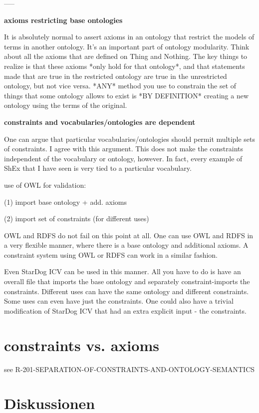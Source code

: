 \documentclass{llncs}
\begin{document}
-----

\textbf{axioms restricting base ontologies}

It is absolutely normal to assert axioms in an ontology that restrict the models of terms in another ontology. It's an important part of ontology modularity.
Think about all the axioms that are defined on Thing and Nothing.
The key things to realize is that these axioms *only hold for that ontology*, and that statements made that are true in the restricted ontology are true in the unrestricted ontology, but not vice versa.  
*ANY* method you use to constrain the set of things that some ontology allows to exist is *BY DEFINITION* creating a new ontology using the terms of the original.

\textbf{constraints and vocabularies/ontologies are dependent}

One can argue that particular vocabularies/ontologies should permit multiple sets of constraints.  I agree with this argument.  This does not make the constraints independent of the vocabulary or ontology, however.  In fact, every example of ShEx that I have seen is very tied to a particular vocabulary.

use of OWL for validation:

(1) import base ontology + add. axioms

(2) import set of constraints (for different uses)

OWL and RDFS do not fail on this point at all.  One can use OWL and RDFS in a very flexible manner, where there is a base ontology and additional axioms.  A constraint system using OWL or RDFS can work in a similar fashion.

Even StarDog ICV can be used in this manner.  All you have to do is have an overall file that imports the base ontology and separately constraint-imports the constraints.  Different uses can have the same ontology and different constraints.  Some uses can even have just the constraints.  One could also have a trivial modification of StarDog ICV that had an extra explicit input - the constraints.

\section{constraints vs. axioms}

see R-201-SEPARATION-OF-CONSTRAINTS-AND-ONTOLOGY-SEMANTICS

\section{Diskussionen}
\end{document}
